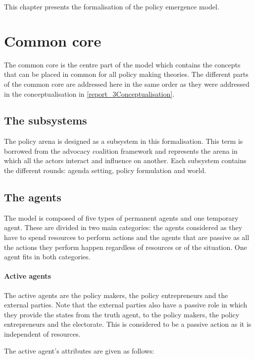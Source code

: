 This chapter presents the formalisation of the policy emergence model.


\section{Common core}

The common core is the centre part of the model which contains the concepts that can be placed in common for all policy making theories. The different parts of the common core are addressed here in the same order as they were addressed in the conceptualisation in \autoref{report_3Conceptualisation}.

\subsection{The subsystems}

The policy arena is designed as a subsystem in this formalisation. This term is borrowed from the advocacy coalition framework and represents the arena in which all the actors interact and influence on another. Each subsystem contains the different rounds: agenda setting, policy formulation and world.

\subsection{The agents}

The model is composed of five types of permanent agents and one temporary agent. These are divided in two main categories: the agents considered as they have to spend resources to perform actions and the agents that are passive as all the actions they perform happen regardless of resources or of the situation. One agent fits in both categories.

\paragraph{Active agents}

The active agents are the policy makers, the policy entrepreneurs and the external parties. Note that the external parties also have a passive role in which they provide the states from the truth agent, to the policy makers, the policy entrepreneurs and the electorate. This is considered to be a passive action as it is independent of resources.

The active agent's attributes are given as follows:

